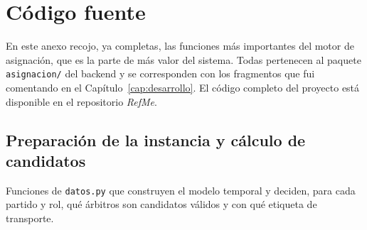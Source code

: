 \documentclass[11pt,a4paper,spanish]{book}
\numberwithin{equation}{chapter}
\numberwithin{figure}{chapter}
\numberwithin{table}{chapter}
\begin{document}
\chapter{Código fuente}

En este anexo recojo, ya completas, las funciones más importantes del motor de asignación, que es la parte de más valor del sistema. Todas pertenecen al paquete \texttt{asignacion/} del backend y se corresponden con los fragmentos que fui comentando en el Capítulo~\ref{cap:desarrollo}. El código completo del proyecto está disponible en el repositorio \emph{RefMe}.

\section{Preparación de la instancia y cálculo de candidatos}

Funciones de \texttt{datos.py} que construyen el modelo temporal y deciden, para cada partido y rol, qué árbitros son candidatos válidos y con qué etiqueta de transporte.
\end{document}
